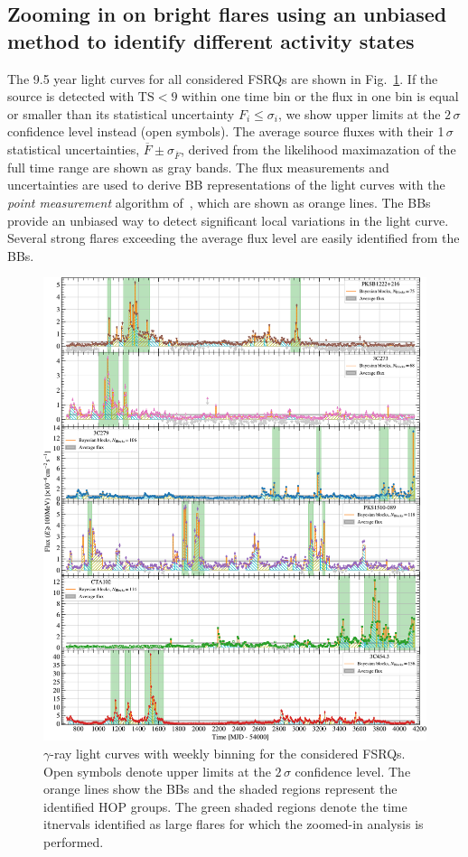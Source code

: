 \documentclass[twocolumn]{aastex62}
\newcommand{\gray}{$\gamma$-ray\xspace}
\begin{document}
\subsection{Zooming in on bright flares using an unbiased method to identify different activity states}
\label{sec:zoom}

The 9.5 year light curves for all considered FSRQs are shown in Fig.~\ref{fig:weekly}. If the source is detected with $\mathrm{TS} < 9$ within one time bin or the flux in one bin is equal or smaller than its statistical uncertainty $F_i \leqslant \sigma_i$, we show upper limits at the $2\,\sigma$ confidence level instead (open symbols). The average source fluxes with their 1$\,\sigma$ statistical uncertainties, $\overline{F} \pm \sigma_{\overline{F}}$, derived from the likelihood maximazation of the full time range are shown as gray bands. 
The flux measurements and uncertainties are used to derive BB representations of the light curves with the \textit{point measurement} algorithm of~\citet[][]{2013ApJ...764..167S}, which are shown as orange lines. 
The BBs provide an unbiased way to detect significant local variations in the light curve.
Several strong flares exceeding the average flux level are easily identified from the BBs. 

\begin{figure}
    \centering
    \includegraphics[width = .9\linewidth]{figures/lc_weekly_tsmin9.pdf}
    \caption{\gray light curves with weekly binning for the considered FSRQs. Open symbols denote upper limits at the $2\,\sigma$ confidence level. The orange lines show the BBs and the shaded regions represent the identified HOP groups. The green shaded regions denote the time itnervals identified as large flares for which the zoomed-in analysis is performed.}
    \label{fig:weekly}
\end{figure}
\end{document}
